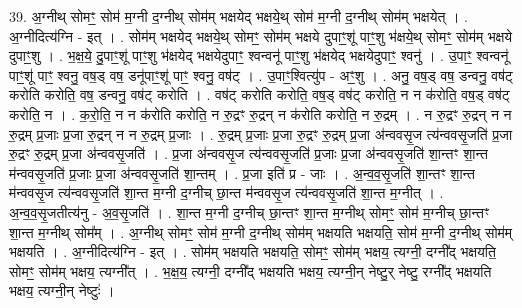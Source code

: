 \documentclass[17pt]{extarticle}
\begin{document}
39. अ॒ग्नीथ् सोमꣳ॒॒ सोम॑ म॒ग्नी द॒ग्नीथ् सोम॑म् भक्षयेद् भक्षये॒थ् सोम॑ म॒ग्नी द॒ग्नीथ् सोम॑म् भक्षयेत् । . अ॒ग्नीदित्य॑ग्नि - इत् । . सोम॑म् भक्षयेद् भक्षये॒थ् सोमꣳ॒॒ सोम॑म् भक्षये दुपाꣳ॒॒शू॑ पाꣳ॒॒शु भ॑क्षये॒थ् सोमꣳ॒॒ सोम॑म् भक्षये दुपाꣳ॒॒शु । . भ॒क्ष॒ये॒ दु॒पाꣳ॒॒शू॑ पाꣳ॒॒शु भ॑क्षयेद् भक्षयेदुपाꣳ॒॒ श्वन्वनू॑ पाꣳ॒॒शु भ॑क्षयेद् भक्षयेदुपाꣳ॒॒ श्वनु॑ । . उ॒पाꣳ॒॒ श्वन्वनू॑ पाꣳ॒॒शू॑ पाꣳ॒॒ श्वनु॒ वष॒ड् वष॒ डनू॑पाꣳ॒॒शू॑ पाꣳ॒॒ श्वनु॒ वष॑ट् । . उ॒पाꣳ॒॒श्वित्यु॑प - अꣳ॒॒शु । . अनु॒ वष॒ड् वष॒ डन्वनु॒ वष॑ट् करोति करोति॒ वष॒ डन्वनु॒ वष॑ट् करोति । . वष॑ट् करोति करोति॒ वष॒ड् वष॑ट् करोति॒ न न क॑रोति॒ वष॒ड् वष॑ट् करोति॒ न । . क॒रो॒ति॒ न न क॑रोति करोति॒ न रु॒द्रꣳ रु॒द्रन् न क॑रोति करोति॒ न रु॒द्रम् । . न रु॒द्रꣳ रु॒द्रन् न न रु॒द्रम् प्र॒जाः प्र॒जा रु॒द्रन् न न रु॒द्रम् प्र॒जाः । . रु॒द्रम् प्र॒जाः प्र॒जा रु॒द्रꣳ रु॒द्रम् प्र॒जा अ॑न्ववसृ॒ज त्य॑न्ववसृ॒जति॑ प्र॒जा रु॒द्रꣳ रु॒द्रम् प्र॒जा अ॑न्ववसृ॒जति॑ । . प्र॒जा अ॑न्ववसृ॒ज त्य॑न्ववसृ॒जति॑ प्र॒जाः प्र॒जा अ॑न्ववसृ॒जति॑ शा॒न्तꣳ शा॒न्त म॑न्ववसृ॒जति॑ प्र॒जाः प्र॒जा अ॑न्ववसृ॒जति॑ शा॒न्तम् । . प्र॒जा इति॑ प्र - जाः । . अ॒न्व॒व॒सृ॒जति॑ शा॒न्तꣳ शा॒न्त म॑न्ववसृ॒ज त्य॑न्ववसृ॒जति॑ शा॒न्त म॒ग्नी द॒ग्नीच् छा॒न्त म॑न्ववसृ॒ज त्य॑न्ववसृ॒जति॑ शा॒न्त म॒ग्नीत् । . अ॒न्व॒व॒सृ॒जतीत्य॑नु - अ॒व॒सृ॒जति॑ । . शा॒न्त म॒ग्नी द॒ग्नीच् छा॒न्तꣳ शा॒न्त म॒ग्नीथ् सोमꣳ॒॒ सोम॑ म॒ग्नीच् छा॒न्तꣳ शा॒न्त म॒ग्नीथ् सोम᳚म् । . अ॒ग्नीथ् सोमꣳ॒॒ सोम॑ म॒ग्नी द॒ग्नीथ् सोम॑म् भक्षयति भक्षयति॒ सोम॑ म॒ग्नी द॒ग्नीथ् सोम॑म् भक्षयति । . अ॒ग्नीदित्य॑ग्नि - इत् । . सोम॑म् भक्षयति भक्षयति॒ सोमꣳ॒॒ सोम॑म् भक्षय॒ त्यग्नी॒ दग्नी᳚द् भक्षयति॒ सोमꣳ॒॒ सोम॑म् भक्षय॒ त्यग्नी᳚त् । . भ॒क्ष॒य॒ त्यग्नी॒ दग्नी᳚द् भक्षयति भक्षय॒ त्यग्नी॒न् नेष्टु॒र् नेष्टु॒ रग्नी᳚द् भक्षयति भक्षय॒ त्यग्नी॒न् नेष्टुः॑ । \newline
\end{document}
